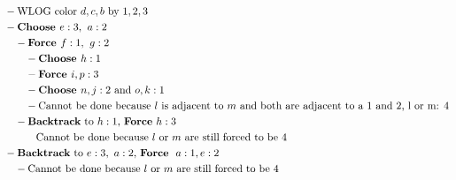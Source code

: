\documentclass[12pt, letterpaper]{article}
\begin{document}
\begin{center}
\begin{align*}
    &- \text{WLOG color $d, c, b$ by $1,2,3$} \\
&- \textbf{Choose $e: 3, \ a : 2$} \\
&\quad - \textbf{Force $f: 1, \ g: 2$} \\
&\quad\quad - \textbf{Choose $h:1$} \\
&\quad\quad - \textbf{Force $i, p: 3$} \\
&\quad\quad - \textbf{Choose $n,j:2$} \ \text {and $o, k: 1$}  \\
&\quad\quad  - \text{Cannot be done because $l$ is adjacent to $m$ and both are adjacent to a 1 and 2, l or m: 4} \\
&\quad-\textbf{Backtrack}\ \text{to $h:1$, \textbf{Force} $h: 3$} \\
&\quad\quad\quad\text{Cannot be done because $l \ \text{or} \ m$ are still  forced to be 4} \\
& - \textbf{Backtrack} \ \text{to $e:3, \ a:2$, \textbf{Force} \ $a:1, e:2$} \\
&\quad- \text{Cannot be done because $l \ \text{or} \ m$ are still forced to be 4}  \\ \\
\end{align*}
\end{center}
\end{document}
